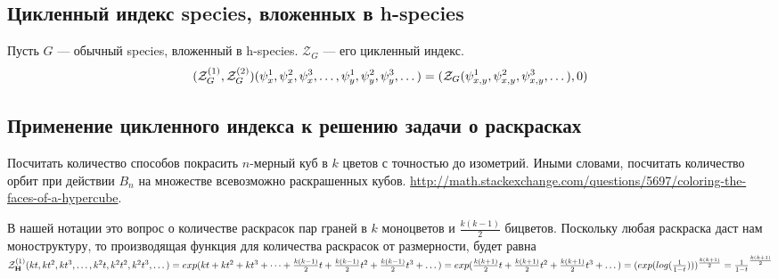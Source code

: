 \subsection{Цикленный индекс species, вложенных в h-species}
\begin{statement}
Пусть $G$ --- обычный species, вложенный в h-species. $\mathcal Z_G$ --- его
цикленный индекс.
$$(\mathcal Z^{(1)}_G, \mathcal Z^{(2)}_G)
(\psi_x^1, \psi_x^2, \psi_x^3, \dots, 
\psi_y^1, \psi_y^2, \psi_y^3, \dots)
 = (\mathcal Z_G(\psi_{x,y}^1, \psi_{x,y}^2, \psi_{x,y}^3, \dots), 0)$$
\end{statement}

\subsection{Применение цикленного индекса к решению задачи о раскрасках}
\begin{problem}
Посчитать количество способов покрасить $n$-мерный куб в $k$ цветов с точностью
до изометрий. Иными словами, посчитать количество орбит при действии $B_n$ на
множестве всевозможно раскрашенных кубов. \url{http://math.stackexchange.com/questions/5697/coloring-the-faces-of-a-hypercube}.
\end{problem}
\begin{solution}
В нашей нотации это вопрос о количестве раскрасок пар граней в $k$ моноцветов и
$\frac{k(k-1)}{2}$ бицветов. Поскольку любая раскраска даст нам моноструктуру,
то производящая функция для количества раскрасок от размерности, будет равна
$\mathcal Z^{(1)}_{\mathbf H}(kt, kt^2, kt^3, \dots, k^2t,
k^2t^2, k^2t^3, \dots) = exp(kt + kt^2 + kt^3 + \dots
+ \frac{k(k-1)}{2}t + \frac{k(k-1)}{2}t^2 + \frac{k(k-1)}{2}t^3 + \dots) =
exp(\frac{k(k+1)}{2}t + \frac{k(k+1)}{2}t^2 + \frac{k(k+1)}{2}t^3 + \dots) =
(exp(log(\frac{1}{1-t})))^{\frac{k(k+1)}{2}} = \frac{1}{1-t}^{\frac{k(k+1)}{2}}$
\end{solution}
